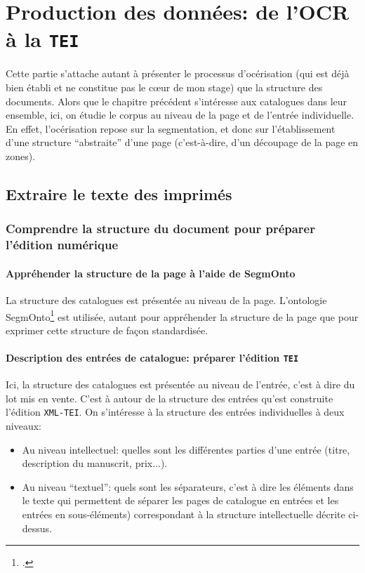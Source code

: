 \documentclass[a4paper, 12pt, twoside]{book}
\newcommand{\tei}{\texttt{TEI}}
\newcommand{\xmltei}{\texttt{XML-TEI}}
\begin{document}
\chapter{Production des données: de l'OCR à la \tei{}}
Cette partie s'attache autant à présenter le processus d'océrisation (qui est déjà bien établi et ne constitue pas le cœur de mon stage) que la structure des documents. Alors que le chapitre précédent s'intéresse aux catalogues dans leur ensemble, ici, on étudie le corpus au niveau de la page et de l'entrée individuelle. En effet, l'océrisation repose sur la segmentation, et donc sur l'établissement d'une structure \enquote{abstraite} d'une page (c'est-à-dire, d'un découpage de la page en zones).

\section{Extraire le texte des imprimés}
\subsection{Comprendre la structure du document pour préparer l'édition numérique}

\subsubsection{Appréhender la structure de la page à l'aide de SegmOnto}
La structure des catalogues est présentée au niveau de la page. L'ontologie SegmOnto\footcite{christensen_segmonto_2022} est utilisée, autant pour appréhender la structure de la page que pour exprimer cette structure de façon standardisée.

\subsubsection{Description des entrées de catalogue: préparer l'édition \tei{}}
Ici, la structure des catalogues est présentée au niveau de l'entrée, c'est à dire du lot mis en vente. C'est à autour de la structure des entrées qu'est construite l'édition \xmltei{}. On s'intéresse à la structure des entrées individuelles à deux niveaux:
\begin{itemize}
	\item Au niveau intellectuel: quelles sont les différentes parties d'une entrée (titre, description du manuscrit, prix...).
	\item Au niveau  \enquote{textuel}: quels sont les séparateurs, c'est à dire les éléments dans le texte qui permettent de séparer les pages de catalogue en entrées et les entrées en sous-éléments) correspondant à la structure intellectuelle décrite ci-dessus.
\end{itemize}
\end{document}
